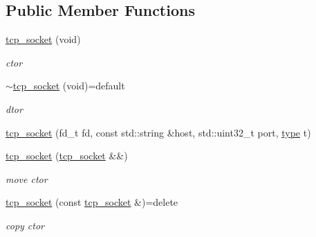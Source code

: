 \subsection*{Public Member Functions}
\begin{DoxyCompactItemize}
\item 
\mbox{\label{classtacopie_1_1tcp__socket_a88ed1cadb0263591c4d31805e0a1a001}} 
\hyperlink{classtacopie_1_1tcp__socket_a88ed1cadb0263591c4d31805e0a1a001}{tcp\+\_\+socket} (void)
\begin{DoxyCompactList}\small\item\em ctor \end{DoxyCompactList}\item 
\mbox{\label{classtacopie_1_1tcp__socket_a4bd737a76a2a326be03d704f79a35282}} 
\hyperlink{classtacopie_1_1tcp__socket_a4bd737a76a2a326be03d704f79a35282}{$\sim$tcp\+\_\+socket} (void)=default
\begin{DoxyCompactList}\small\item\em dtor \end{DoxyCompactList}\item 
\hyperlink{classtacopie_1_1tcp__socket_a191ffa48e0753ad4ec87d4d3a4a97822}{tcp\+\_\+socket} (fd\+\_\+t fd, const std\+::string \&host, std\+::uint32\+\_\+t port, \hyperlink{classtacopie_1_1tcp__socket_ad8376e85df96ab9523f5d079ed7172ab}{type} t)
\item 
\mbox{\label{classtacopie_1_1tcp__socket_a64f69cd1c185b523b543d4ea53cee1a2}} 
\hyperlink{classtacopie_1_1tcp__socket_a64f69cd1c185b523b543d4ea53cee1a2}{tcp\+\_\+socket} (\hyperlink{classtacopie_1_1tcp__socket}{tcp\+\_\+socket} \&\&)
\begin{DoxyCompactList}\small\item\em move ctor \end{DoxyCompactList}\item 
\mbox{\label{classtacopie_1_1tcp__socket_a5ae1a5b0f9713ef256164afdbeb1c193}} 
\hyperlink{classtacopie_1_1tcp__socket_a5ae1a5b0f9713ef256164afdbeb1c193}{tcp\+\_\+socket} (const \hyperlink{classtacopie_1_1tcp__socket}{tcp\+\_\+socket} \&)=delete
\begin{DoxyCompactList}\small\item\em copy ctor \end{DoxyCompactList}\item 

\end{DoxyCompactItemize}
